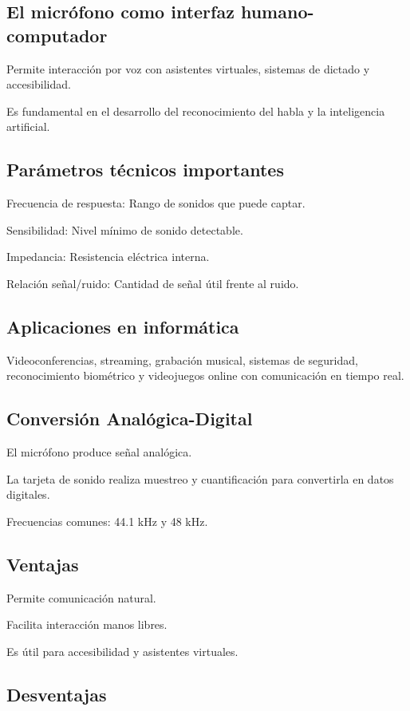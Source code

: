 \documentclass[12pt, letterpaper]{article}
\begin{document}
\subsection{El micrófono como interfaz humano-computador}

Permite interacción por voz con asistentes virtuales, sistemas de dictado y accesibilidad.

Es fundamental en el desarrollo del reconocimiento del habla y la inteligencia artificial.

\subsection{Parámetros técnicos importantes}

Frecuencia de respuesta: Rango de sonidos que puede captar.

Sensibilidad: Nivel mínimo de sonido detectable.

Impedancia: Resistencia eléctrica interna.

Relación señal/ruido: Cantidad de señal útil frente al ruido.

\subsection{Aplicaciones en informática}

Videoconferencias, streaming, grabación musical, sistemas de seguridad, reconocimiento biométrico
y videojuegos online con comunicación en tiempo real.

\subsection{Conversión Analógica-Digital}

El micrófono produce señal analógica.

La tarjeta de sonido realiza muestreo y cuantificación para convertirla en datos digitales.

Frecuencias comunes: 44.1 kHz y 48 kHz.

\subsection{Ventajas}

Permite comunicación natural.

Facilita interacción manos libres.

Es útil para accesibilidad y asistentes virtuales.

\subsection{Desventajas}
\end{document}
